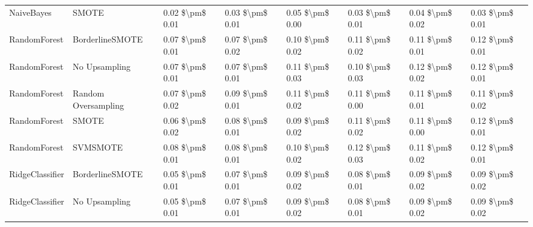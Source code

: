 \begin{tabular}{llllllll}
                     NaiveBayes &                         SMOTE & 0.02 \$\textbackslash pm\$ 0.01 &           0.03 \$\textbackslash pm\$ 0.01 &       0.05 \$\textbackslash pm\$ 0.00 &        0.03 \$\textbackslash pm\$ 0.01 &                         0.04 \$\textbackslash pm\$ 0.02 & 0.03 \$\textbackslash pm\$ 0.01 \\
                   RandomForest &               BorderlineSMOTE & 0.07 \$\textbackslash pm\$ 0.01 &           0.07 \$\textbackslash pm\$ 0.02 &       0.10 \$\textbackslash pm\$ 0.02 &        0.11 \$\textbackslash pm\$ 0.02 &                         0.11 \$\textbackslash pm\$ 0.01 & 0.12 \$\textbackslash pm\$ 0.01 \\
                   RandomForest &                 No Upsampling & 0.07 \$\textbackslash pm\$ 0.01 &           0.07 \$\textbackslash pm\$ 0.01 &       0.11 \$\textbackslash pm\$ 0.03 &        0.10 \$\textbackslash pm\$ 0.03 &                         0.12 \$\textbackslash pm\$ 0.02 & 0.12 \$\textbackslash pm\$ 0.01 \\
                   RandomForest &           Random Oversampling & 0.07 \$\textbackslash pm\$ 0.02 &           0.09 \$\textbackslash pm\$ 0.01 &       0.11 \$\textbackslash pm\$ 0.02 &        0.11 \$\textbackslash pm\$ 0.00 &                         0.11 \$\textbackslash pm\$ 0.01 & 0.11 \$\textbackslash pm\$ 0.02 \\
                   RandomForest &                         SMOTE & 0.06 \$\textbackslash pm\$ 0.02 &           0.08 \$\textbackslash pm\$ 0.01 &       0.09 \$\textbackslash pm\$ 0.02 &        0.11 \$\textbackslash pm\$ 0.02 &                         0.11 \$\textbackslash pm\$ 0.00 & 0.12 \$\textbackslash pm\$ 0.01 \\
                   RandomForest &                      SVMSMOTE & 0.08 \$\textbackslash pm\$ 0.01 &           0.08 \$\textbackslash pm\$ 0.01 &       0.10 \$\textbackslash pm\$ 0.02 &        0.12 \$\textbackslash pm\$ 0.03 &                         0.11 \$\textbackslash pm\$ 0.02 & 0.12 \$\textbackslash pm\$ 0.01 \\
                RidgeClassifier &               BorderlineSMOTE & 0.05 \$\textbackslash pm\$ 0.01 &           0.07 \$\textbackslash pm\$ 0.01 &       0.09 \$\textbackslash pm\$ 0.02 &        0.08 \$\textbackslash pm\$ 0.01 &                         0.09 \$\textbackslash pm\$ 0.02 & 0.09 \$\textbackslash pm\$ 0.02 \\
                RidgeClassifier &                 No Upsampling & 0.05 \$\textbackslash pm\$ 0.01 &           0.07 \$\textbackslash pm\$ 0.01 &       0.09 \$\textbackslash pm\$ 0.02 &        0.08 \$\textbackslash pm\$ 0.01 &                         0.09 \$\textbackslash pm\$ 0.02 & 0.09 \$\textbackslash pm\$ 0.02 \\

\end{tabular}
